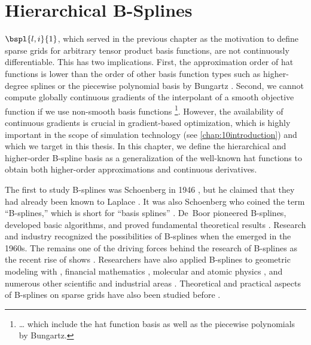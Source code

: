 
\chapter{Hierarchical B-Splines}
\label{chap:30BSplines}

 $\bspl{l,i}{1}$,
which served in the previous chapter as the motivation
to define sparse grids for arbitrary tensor product basis functions,
are not continuously differentiable.
This has two implications.
First, the approximation order of hat functions
is lower than the order of other basis function types
such as higher-degree splines \cite{Sickel11Spline}
or the piecewise polynomial basis by Bungartz \cite{Bungartz98Finite}.
Second, we cannot compute globally continuous gradients of the
interpolant of a smooth objective function
if we use non-smooth basis functions%
\footnote{%
  \dots{} which include the hat function basis as well as
  the piecewise polynomials by Bungartz.%
}.
However, the availability of continuous gradients is
crucial in gradient-based optimization,
which is highly important in
the scope of simulation technology (see \cref{chap:10introduction}) and
which we target in this thesis.
In this chapter, we define the hierarchical and
higher-order B-spline basis
as a generalization of the well-known hat functions
to obtain both higher-order approximations
and continuous derivatives.

The first to study B-splines was Schoenberg in 1946
\cite{Schoenberg46Contributions},
but he claimed that they had already been known to Laplace
\cite{Boor76Splines}.
It was also Schoenberg who coined the term ``B-splines,''
which is short for ``basis splines'' \cite{Schoenberg67Spline}.
De~Boor pioneered B-splines, developed basic algorithms, and
proved fundamental theoretical results \cite{Boor72Calculating}.
Research and industry recognized the possibilities of B-splines when
the \fem emerged in the 1960s.
The \fem remains one of the driving forces behind the research of
B-splines \cite{Hoellig03Finite} as the recent rise of \iga shows
.
Researchers have also applied B-splines to
geometric modeling with \nurbs
{},
financial mathematics \cite{Pflueger10Spatially},
molecular and atomic physics
,
and numerous other scientific and industrial areas
.
Theoretical and practical aspects of B-splines on sparse grids
have also been studied before
.

